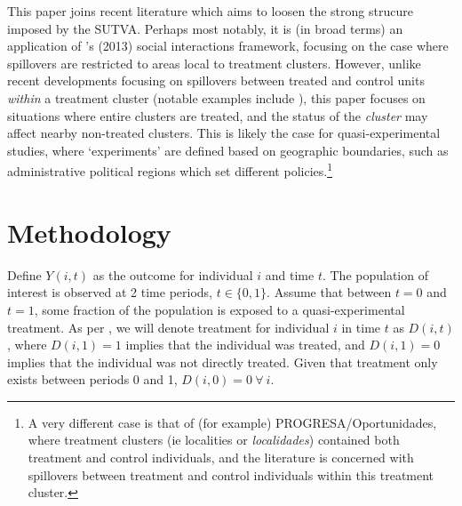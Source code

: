 \documentclass{article}
\begin{document}
\begin{spacing}{1.1}
This paper joins recent literature which aims to loosen the strong strucure 
imposed by the SUTVA.  Perhaps most notably, it is (in broad terms) an 
application of \citeauthor{Manski2013}'s (2013) social interactions framework, 
focusing on the case where spillovers are restricted to areas local to treatment 
clusters.  However, unlike recent developments focusing on spillovers 
between treated and control units \emph{within} a treatment cluster (notable
examples include \citet{McIntosh2008,Bairdetal2014,AngelucciDiMaro2010}), this 
paper focuses on situations where entire clusters are treated, and the status
of the \emph{cluster} may affect nearby non-treated clusters.  This is likely
the case for quasi-experimental studies, where `experiments' are defined based
on geographic boundaries, such as administrative political regions which set 
different policies.\footnote{A very different case is that of (for example)
PROGRESA/Oportunidades, where treatment clusters (ie localities or 
\emph{localidades}) contained both treatment and control individuals, and the
literature is concerned with spillovers between treatment and control individuals
within this treatment cluster.}

\nocite{AngelucciDeGiorgi2009} \nocite{Heckmanetal1998}
\nocite{MiguelKremer2004}
 \nocite{Heckmanetal1998b}

\section{Methodology}
Define $Y(i,t)$ as the outcome for individual $i$ and time $t$.  The population
of interest is observed at 2 time periods, $t\in \{0,1\}$.  Assume that between
$t=0$ and $t=1$, some fraction of the population is exposed to a 
quasi-experimental treatment.  As per \citet{Abadie2005}, we will denote 
treatment for individual $i$ in time $t$ as $D(i,t)$, where $D(i,1)=1$ implies 
that the individual was treated, and $D(i,1)=0$ implies that the individual was
not directly treated.  Given that treatment only exists between periods 0 and 1,
$D(i,0)=0\ \forall\ i$.


\end{spacing}
\end{document}

